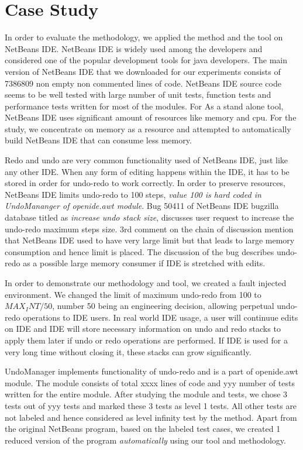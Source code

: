 \section{Case Study}

In order to evaluate the methodology, we applied the method and the tool on NetBeans IDE. NetBeans IDE is widely used among the developers and considered one of the popular development tools for java developers.  The main version of NetBeans IDE that we downloaded for our experiments consists of 7386809 non empty non commented lines of code. NetBeans IDE source code seems to be well tested with large number of unit tests, function tests and performance tests written for most of the modules. For As a stand alone tool, NetBeans IDE uses significant amount of resources like memory and cpu. For the study, we concentrate on memory as a resource and attempted to automatically build NetBeans IDE that can consume less memory.

Redo and undo are very common functionality used of NetBeans IDE, just like any other IDE. When any form of editing happens within the IDE, it has to be stored in order for undo-redo to work correctly. In order to preserve resources, NetBeans IDE limits undo-redo to 100 steps, \emph{value 100 is hard coded in UndoMananger of openide.awt module}. Bug 50411 of NetBeans IDE bugzilla database titled as \emph{increase undo stack size}, discusses user request to increase the undo-redo maximum steps size. 3rd comment on the chain of discussion mention that NetBeans IDE used to have very large limit but that leads to large memory consumption and hence limit is placed. The discussion of the bug describes undo-redo as a possible large memory consumer if IDE is stretched with edits. 

In order to demonstrate our methodology and tool, we created a fault injected environment. We changed the limit of maximum undo-redo from 100 to $MAX_INT / 50$, number 50 being an engineering decision, allowing perpetual undo-redo operations to IDE users.  In real world IDE usage, a user will continuue edits on IDE  and IDE will store necessary information on undo and redo stacks to apply them later if undo or redo operations are performed. If IDE is used for a very long time without closing it, these stacks can grow significantly. 

UndoManager implements functionality of undo-redo and is a part of openide.awt module. The module consists of total xxxx lines of code and yyy number of tests written for the entire module. After studying the module and tests, we chose 3 tests out of yyy tests and marked these 3 tests as level 1 tests. All other tests are not labeled and hence considered as level infinity test by the method. Apart from the original NetBeans program, based on the labeled test cases, we created 1 reduced version of the program \emph{automatically} using our tool and methodology. 


